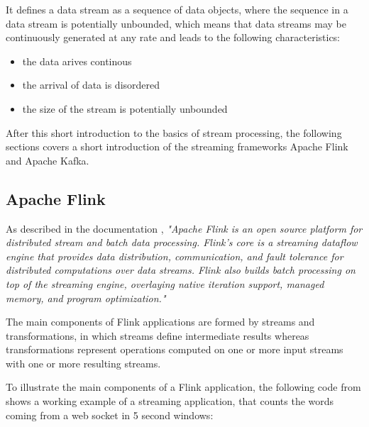 It defines a data stream as a sequence of data objects, where the sequence in a data stream
is potentially unbounded, which means that data streams may be continuously generated
at any rate \cite{Nam15} and leads to the following characteristics:
\begin{itemize}
	\item the data arives continous
	\item the arrival of data is disordered
	\item the size of the stream is potentially unbounded
\end{itemize}

After this short introduction to the basics of stream processing, the following sections
covers a short introduction of the streaming frameworks Apache Flink and Apache Kafka.
\subsection{Apache Flink}

As described in the documentation \cite{FlinkD16}, \textit{"Apache Flink is an open source platform for
distributed stream and batch data processing. Flink’s core is a streaming dataflow engine that
provides data distribution, communication, and fault tolerance for distributed computations over
data streams. Flink also builds batch processing on top of the streaming engine, overlaying native
iteration support, managed memory, and program optimization."}

The main components of Flink applications are formed by streams and transformations, in which
streams define intermediate results whereas transformations represent operations computed on one
or more input streams with one or more resulting streams.

To illustrate the main components of a Flink application, the following code from \cite{FlinkD16} shows
a working example of a streaming application, that counts the words coming from a web socket in 5
second windows:

